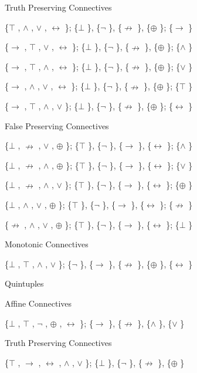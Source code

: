 \protect\hypertarget{anchor-22}{}{}Truth Preserving Connectives

\{$\top$ , $\land$ , $\lor$ , $\leftrightarrow$ \}; \{$\bot$ \}, \{$\neg$ \}, \{$\nrightarrow$ \}, \{$\oplus$ \}; \{$\to$ \}

\{$\to$ , $\top$ , $\lor$ , $\leftrightarrow$ \}; \{$\bot$ \}, \{$\neg$ \}, \{$\nrightarrow$ \}, \{$\oplus$ \}; \{$\land$ \}

\{$\to$ , $\top$ , $\land$ , $\leftrightarrow$ \}; \{$\bot$ \}, \{$\neg$ \}, \{$\nrightarrow$ \}, \{$\oplus$ \}; \{$\lor$ \}

\{$\to$ , $\land$ , $\lor$ , $\leftrightarrow$ \}; \{$\bot$ \}, \{$\neg$ \}, \{$\nrightarrow$ \}, \{$\oplus$ \}; \{$\top$ \}

\{$\to$ , $\top$ , $\land$ , $\lor$ \}; \{$\bot$ \}, \{$\neg$ \}, \{$\nrightarrow$ \}, \{$\oplus$ \}; \{$\leftrightarrow$ \}

\protect\hypertarget{anchor-23}{}{}False Preserving Connectives

\{$\bot$ , $\nrightarrow$ , $\lor$ , $\oplus$ \}; \{$\top$ \}, \{$\neg$ \}, \{$\to$ \}, \{$\leftrightarrow$ \}; \{$\land$ \}

\{$\bot$ , $\nrightarrow$ , $\land$ , $\oplus$ \}; \{$\top$ \}, \{$\neg$ \}, \{$\to$ \}, \{$\leftrightarrow$ \}; \{$\lor$ \}

\{$\bot$ , $\nrightarrow$ , $\land$ , $\lor$ \}; \{$\top$ \}, \{$\neg$ \}, \{$\to$ \}, \{$\leftrightarrow$ \}; \{$\oplus$ \}

\{$\bot$ , $\land$ , $\lor$ , $\oplus$ \}; \{$\top$ \}, \{$\neg$ \}, \{$\to$ \}, \{$\leftrightarrow$ \}; \{$\nrightarrow$ \}

\{$\nrightarrow$ , $\land$ , $\lor$ , $\oplus$ \}; \{$\top$ \}, \{$\neg$ \}, \{$\to$ \}, \{$\leftrightarrow$ \}; \{$\bot$ \}

\protect\hypertarget{anchor-24}{}{}Monotonic Connectives

\{$\bot$ , $\top$ , $\land$ , $\lor$ \}; \{$\neg$ \}, \{$\to$ \}, \{$\nrightarrow$ \}, \{$\oplus$ \}, \{$\leftrightarrow$ \}

\protect\hypertarget{anchor-25}{}{}Quintuples

\protect\hypertarget{anchor-26}{}{}Affine Connectives

\{$\bot$ , $\top$ , $\neg$ , $\oplus$ , $\leftrightarrow$ \}; \{$\to$ \}, \{$\nrightarrow$ \}, \{$\land$ \}, \{$\lor$ \}

\protect\hypertarget{anchor-27}{}{}Truth Preserving Connectives

\{$\top$ , $\to$ , $\leftrightarrow$ , $\land$ , $\lor$ \}; \{$\bot$ \}, \{$\neg$ \}, \{$\nrightarrow$ \}, \{$\oplus$ \}

